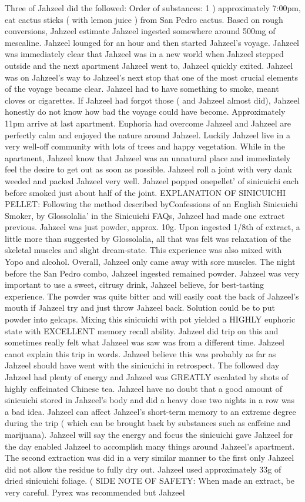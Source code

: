 \documentclass[12pt]{book}
\begin{document}
Three of Jahzeel did the followed: Order of substances: 1 ) approximately 7:00pm, eat cactus sticks ( with lemon juice ) from San Pedro cactus. Based on rough conversions, Jahzeel estimate Jahzeel ingested somewhere around 500mg of mescaline. Jahzeel lounged for an hour and then started Jahzeel's voyage. Jahzeel was immediately clear that Jahzeel was in a new world when Jahzeel stepped outside and the next apartment Jahzeel went to, Jahzeel quickly exited. Jahzeel was on Jahzeel's way to Jahzeel's next stop that one of the most crucial elements of the voyage became clear. Jahzeel had to have something to smoke, meant cloves or cigarettes. If Jahzeel had forgot those ( and Jahzeel almost did), Jahzeel honestly do not know how bad the voyage could have become. Approximately 11pm arrive at last apartment. Euphoria had overcome Jahzeel and Jahzeel are perfectly calm and enjoyed the nature around Jahzeel. Luckily Jahzeel live in a very well-off community with lots of trees and happy vegetation. While in the apartment, Jahzeel know that Jahzeel was an unnatural place and immediately feel the desire to get out as soon as possible. Jahzeel roll a joint with very dank weeded and packed Jahzeel very well. Jahzeel popped onepellet' of sinicuichi each before smoked just about half of the joint. EXPLANATION OF SINICUICHI PELLET: Following the method described byConfessions of an English Sinicuichi Smoker, by Glossolalia' in the Sinicuichi FAQs, Jahzeel had made one extract previous. Jahzeel was just powder, approx. 10g. Upon ingested 1/8th of extract, a little more than suggested by Glossolalia, all that was felt was relaxation of the skeletal muscles and slight dream-state. This experience was also mixed with Yopo and alcohol. Overall, Jahzeel only came away with sore muscles. The night before the San Pedro combo, Jahzeel ingested remained powder. Jahzeel was very important to use a sweet, citrusy drink, Jahzeel believe, for best-tasting experience. The powder was quite bitter and will easily coat the back of Jahzeel's mouth if Jahzeel try and just throw Jahzeel back. Solution could be to put powder into gelcaps. Mixing this sinicuichi with pot yielded a HIGHLY euphoric state with EXCELLENT memory recall ability. Jahzeel did trip on this and sometimes really felt what Jahzeel was saw was from a different time. Jahzeel canot explain this trip in words. Jahzeel believe this was probably as far as Jahzeel should have went with the sinicuichi in retrospect. The followed day Jahzeel had plenty of energy and Jahzeel was GREATLY escalated by shots of highly caffeinated Chinese tea. Jahzeel have no doubt that a good amount of sinicuichi stored in Jahzeel's body and did a heavy dose two nights in a row was a bad idea. Jahzeel can affect Jahzeel's short-term memory to an extreme degree during the trip ( which can be brought back by substances such as caffeine and marijuana). Jahzeel will say the energy and focus the sinicuichi gave Jahzeel for the day enabled Jahzeel to accomplish many things around Jahzeel's apartment. The second extraction was did in a very similar manner to the first only Jahzeel did not allow the residue to fully dry out. Jahzeel used approximately 33g of dried sinicuichi foliage. ( SIDE NOTE OF SAFETY: When made an extract, be very careful. Pyrex was recommended but Jahzeel 
\end{document}

